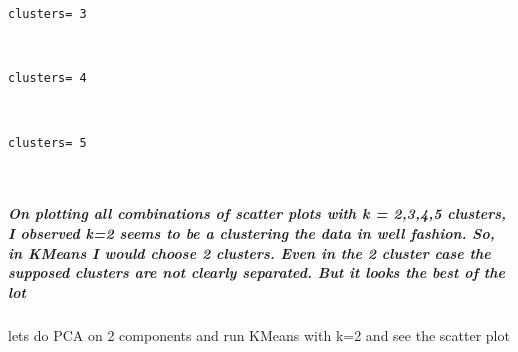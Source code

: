 \documentclass[11pt]{article}
\begin{document}
    \begin{Verbatim}[commandchars=\\\{\}]
clusters= 3

    \end{Verbatim}

    \begin{center}
    \end{center}
    { \hspace*{\fill} \\}
    
    \begin{Verbatim}[commandchars=\\\{\}]
clusters= 4

    \end{Verbatim}

    \begin{center}
    \end{center}
    { \hspace*{\fill} \\}
    
    \begin{Verbatim}[commandchars=\\\{\}]
clusters= 5

    \end{Verbatim}

    \begin{center}
    \end{center}
    { \hspace*{\fill} \\}
    
    \subparagraph{On plotting all combinations of scatter plots with k =
2,3,4,5 clusters, I observed k=2 seems to be a clustering the data in
well fashion. So, in KMeans I would choose 2 clusters. Even in the 2
cluster case the supposed clusters are not clearly separated. But it
looks the best of the
lot}\label{on-plotting-all-combinations-of-scatter-plots-with-k-2345-clusters-i-observed-k2-seems-to-be-a-clustering-the-data-in-well-fashion.-so-in-kmeans-i-would-choose-2-clusters.-even-in-the-2-cluster-case-the-supposed-clusters-are-not-clearly-separated.-but-it-looks-the-best-of-the-lot}

    lets do PCA on 2 components and run KMeans with k=2 and see the scatter
plot
\end{document}
